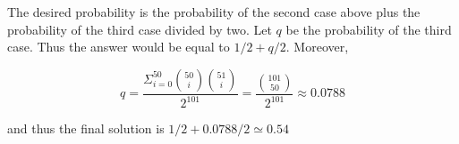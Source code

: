 \begin{solution}
The desired probability is the probability of the second case above plus the probability of the third case divided by two. Let $q$ be the probability of the third case. Thus the answer would be equal to $1/2 + q/2$. Moreover,

$$
q = \frac{\Sigma_{i=0}^{50}{50 \choose i}{51 \choose i}}{2^{101}} = \frac{{101 \choose 50}}{2^ {101}} \approx 0.0788
$$

and thus the final solution is $1/2 + 0.0788/2 \simeq 0.54$
\end{solution}
